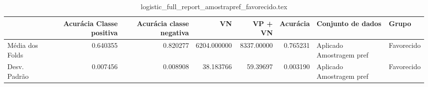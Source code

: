 \begin{table}
\centering
\caption{logistic_full_report_amostrapref_favorecido.tex}
\label{logistic_full_report_amostrapref_favorecido.tex}
\begin{tabular}{lrrrrrll}
\toprule
{} &  Acurácia Classe positiva &  Acurácia classe negativa &          VN  &    VP + VN  &  Acurácia &         Conjunto de dados &       Grupo \\
\midrule
Média dos Folds &                  0.640355 &                  0.820277 &  6204.000000 &  8337.00000 &  0.765231 &  Aplicado Amostragem pref &  Favorecido \\
Desv. Padrão    &                  0.007456 &                  0.008908 &    38.183766 &    59.39697 &  0.003190 &  Aplicado Amostragem pref &  Favorecido \\
\bottomrule
\end{tabular}
\end{table}
